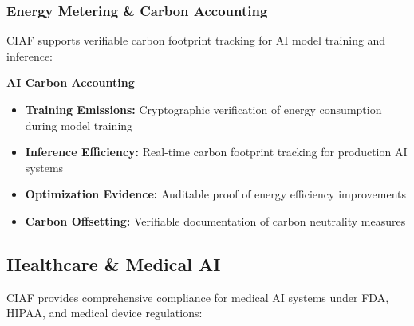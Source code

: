 \documentclass[12pt,a4paper]{article}
\begin{document}
\subsubsection{Energy Metering \& Carbon Accounting}

CIAF supports verifiable carbon footprint tracking for AI model training and inference:

\begin{technicalbox}
\textbf{AI Carbon Accounting}
\begin{itemize}
\item \textbf{Training Emissions:} Cryptographic verification of energy consumption during model training
\item \textbf{Inference Efficiency:} Real-time carbon footprint tracking for production AI systems
\item \textbf{Optimization Evidence:} Auditable proof of energy efficiency improvements
\item \textbf{Carbon Offsetting:} Verifiable documentation of carbon neutrality measures
\end{itemize}
\end{technicalbox}

\subsection{Healthcare \& Medical AI}

CIAF provides comprehensive compliance for medical AI systems under FDA, HIPAA, and medical device regulations:
\end{document}
